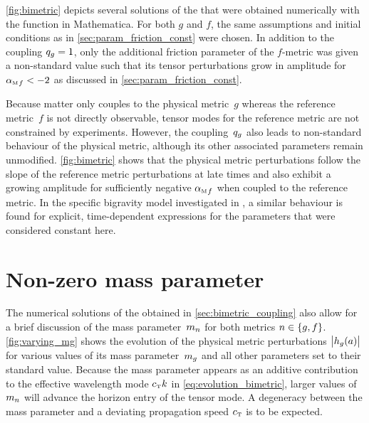 \documentclass[12pt,parskip=half]{scrreprt}
\begin{document}
\autoref{fig:bimetric} depicts several solutions of the  that were obtained numerically with the  function in Mathematica. For both \(g\) and \(f\), the same assumptions and initial conditions as in \autoref{sec:param_friction_const} were chosen. In addition to the coupling \(q_{g}=1\), only the additional friction parameter of the \(f\)-metric was given a non-standard value such that its tensor perturbations grow in amplitude for \({\alpha_{\textnormal{\tiny{M}}}}_{f} < -2\) as discussed in \autoref{sec:param_friction_const}.


Because matter only couples to the physical metric~\(g\) whereas the reference metric~\(f\) is not directly observable, tensor modes for the reference metric are not constrained by experiments.  However, the coupling~\(q_{g}\) also leads to non-standard behaviour of the physical metric, although its other associated parameters remain unmodified. \autoref{fig:bimetric} shows that the physical metric perturbations follow the slope of the reference metric perturbations at late times and also exhibit a growing amplitude for sufficiently negative \({\alpha_{\textnormal{\tiny{M}}}}_{f}\) when coupled to the reference metric. In the specific bigravity model investigated in \cite{Amendola2015}, a similar behaviour is found for explicit, time-dependent expressions for the parameters that were considered constant here. 


\section{Non-zero mass parameter}

The numerical solutions of the  obtained in \autoref{sec:bimetric_coupling} also allow for a brief discussion of the mass parameter~\(m_{n}\) for both metrics \(n \in \cbr{g,f}\). \autoref{fig:varying_mg} shows the evolution of the physical metric perturbations~\(\abs{h_{g}(a)}\) for various values of its mass parameter~\(m_{g}\) and all other parameters set to their standard value. Because the mass parameter appears as an additive contribution to the effective wavelength mode \({c_{\textnormal{\tiny{T}}}} k\) in \eqref{eq:evolution_bimetric}, larger values of \(m_{n}\) will advance the horizon entry of the tensor mode. A degeneracy between the mass parameter and a deviating propagation speed \({c_{\textnormal{\tiny{T}}}}\) is to be expected. 
\end{document}
